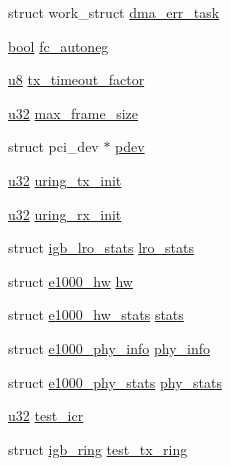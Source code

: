 \begin{DoxyCompactItemize}
\item 
struct work\+\_\+struct \hyperlink{structigb__adapter_a6cbe39db8d0f9cc3f2ab5180f975b468}{dma\+\_\+err\+\_\+task}
\item 
\hyperlink{avb__gptp_8h_af6a258d8f3ee5206d682d799316314b1}{bool} \hyperlink{structigb__adapter_ae7d0017e4cc507a6798307136ec9d6aa}{fc\+\_\+autoneg}
\item 
\hyperlink{lib_2igb_2e1000__osdep_8h_a8baca7e76da9e0e11ce3a275dd19130c}{u8} \hyperlink{structigb__adapter_a490167cfddabd97a3d49c1b40ed9c6b6}{tx\+\_\+timeout\+\_\+factor}
\item 
\hyperlink{lib_2igb_2e1000__osdep_8h_a64e91c10a0d8fb627e92932050284264}{u32} \hyperlink{structigb__adapter_ab2d6e66aa932631abea013f746ba81df}{max\+\_\+frame\+\_\+size}
\item 
struct pci\+\_\+dev $\ast$ \hyperlink{structigb__adapter_a8ac3abd3ce08c19e5087fe271ef3bcc8}{pdev}
\item 
\hyperlink{lib_2igb_2e1000__osdep_8h_a64e91c10a0d8fb627e92932050284264}{u32} \hyperlink{structigb__adapter_ad5021b5f96ba57d48c8c6300cad743af}{uring\+\_\+tx\+\_\+init}
\item 
\hyperlink{lib_2igb_2e1000__osdep_8h_a64e91c10a0d8fb627e92932050284264}{u32} \hyperlink{structigb__adapter_ac9827ee428dd1c94a27b260995bb2525}{uring\+\_\+rx\+\_\+init}
\item 
struct \hyperlink{structigb__lro__stats}{igb\+\_\+lro\+\_\+stats} \hyperlink{structigb__adapter_adccef94bf73d9d366e6a2c97c5b30e6a}{lro\+\_\+stats}
\item 
struct \hyperlink{structe1000__hw}{e1000\+\_\+hw} \hyperlink{structigb__adapter_a7d5953861471302be6287c989e0b20ba}{hw}
\item 
struct \hyperlink{structe1000__hw__stats}{e1000\+\_\+hw\+\_\+stats} \hyperlink{structigb__adapter_a203279ec85dedcf3113813d967644ee9}{stats}
\item 
struct \hyperlink{structe1000__phy__info}{e1000\+\_\+phy\+\_\+info} \hyperlink{structigb__adapter_af10b60c07fa00f34e25403b7c5c0c009}{phy\+\_\+info}
\item 
struct \hyperlink{structe1000__phy__stats}{e1000\+\_\+phy\+\_\+stats} \hyperlink{structigb__adapter_a822fe24ef28cf3be85e1d9597a11c6d3}{phy\+\_\+stats}
\item 
\hyperlink{lib_2igb_2e1000__osdep_8h_a64e91c10a0d8fb627e92932050284264}{u32} \hyperlink{structigb__adapter_a14505f313108586812dd0e3ca17b38b7}{test\+\_\+icr}
\item 
struct \hyperlink{structigb__ring}{igb\+\_\+ring} \hyperlink{structigb__adapter_ad24385913394e01aa32e20adaa04c3cd}{test\+\_\+tx\+\_\+ring}

\end{DoxyCompactItemize}

